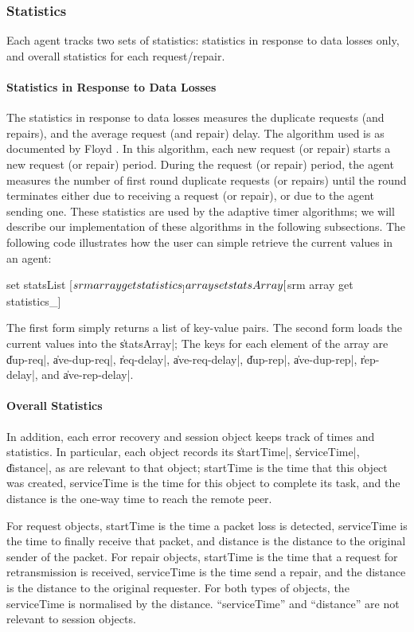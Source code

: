 \documentclass{article}
\begin{document}
\subsubsection{Statistics}
Each agent tracks two sets of statistics:
statistics in response to data losses only,
and overall statistics for each request/repair.

\paragraph{Statistics in Response to Data Losses}
The statistics in response to data losses
measures the duplicate requests (and repairs),
and the average request (and repair) delay.
The algorithm used is as documented by Floyd \etal
\cite{Floy95:Reliable}.
In this algorithm,
each new request (or repair) starts a new request (or repair) period.
During the request (or repair) period, the agent measures
the number of first round duplicate requests (or repairs)
until the round terminates either due to receiving a request (or
repair), or due to the agent sending one.
These statistics are used by the adaptive timer algorithms;
we will describe our implementation of these algorithms in the following
subsections.
The following code illustrates how the user can simple retrieve the
current values in an agent:
\begin{program}
  set statsList [$srm array get statistics_]                \\
  array set statsArray [$srm array get statistics_]             \\
\end{program}
The first form simply returns a list of key-value pairs.
The second form loads the current values into the \|statsArray|;
The keys for each element of the array are
\|dup-req|, \|ave-dup-req|, \|req-delay|, \|ave-req-delay|,
\|dup-rep|, \|ave-dup-rep|, \|rep-delay|, and \|ave-rep-delay|.

\paragraph{Overall Statistics}
In addition, each error recovery and session object keeps track of
times and statistics.
In particular, each object records its
\|startTime|, \|serviceTime|, \|distance|, as are relevant to that object;
startTime is the time that this object was created,
serviceTime is the time for this object to complete its task, and the
distance is the one-way time to reach the remote peer.

For request objects, startTime is the time a packet loss is detected,
serviceTime is the time to finally receive that packet,
and distance is the distance to the original sender of the packet.
For repair objects, startTime is the time that a request for
retransmission is received, serviceTime is the time send a repair,
and the distance is the distance to the original requester.
For both types of objects, the serviceTime is normalised by the
distance.
``serviceTime'' and ``distance'' are not relevant to session objects.
\end{document}
